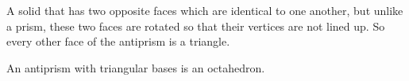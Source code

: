 A solid that has two opposite faces which are identical to one another,
but unlike a prism, these two faces are rotated so that their vertices
are not lined up. So every other face of the antiprism is a triangle.
\par
An antiprism with triangular bases is an octahedron.
